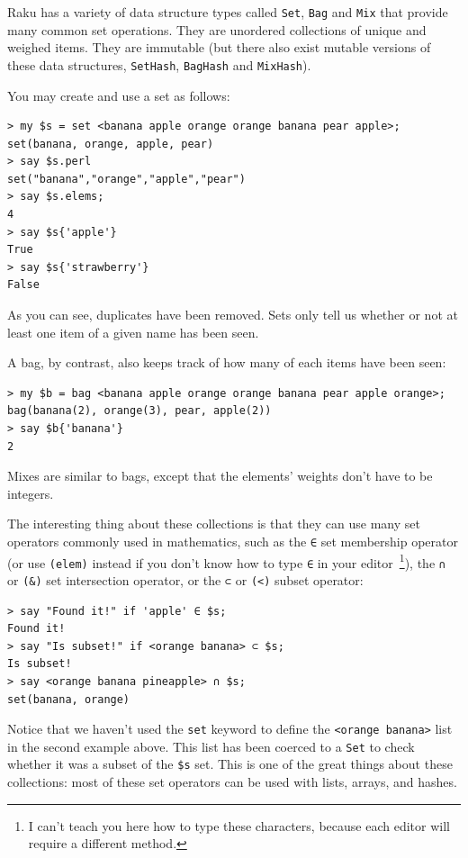 Raku has a variety of data structure types called {\tt Set}, 
{\tt Bag} and {\tt Mix} that provide many common set 
operations. They are unordered collections of unique and 
weighed items. They are immutable (but there also exist mutable 
versions of these data structures, {\tt SetHash}, {\tt BagHash} 
and {\tt MixHash}).

You may create and use a set as follows:

\begin{verbatim}
> my $s = set <banana apple orange orange banana pear apple>;
set(banana, orange, apple, pear)
> say $s.perl
set("banana","orange","apple","pear")
> say $s.elems;
4
> say $s{'apple'}
True
> say $s{'strawberry'}
False
\end{verbatim}
%
As you can see, duplicates have been removed. Sets only tell us 
whether or not at least one item of a given name has been seen.

A bag, by contrast, also keeps track of how many of each items 
have been seen:

\begin{verbatim}
> my $b = bag <banana apple orange orange banana pear apple orange>;
bag(banana(2), orange(3), pear, apple(2))
> say $b{'banana'}
2
\end{verbatim} 

Mixes are similar to bags, except that the elements' weights don't 
have to be integers.

The interesting thing about these collections is that they can use 
many set operators commonly used in mathematics, such as the 
\verb'∈' set membership operator (or use \verb'(elem)' instead 
if you don't know how to type \verb'∈' in your 
editor~\footnote{I can't teach you here how to type these characters, 
because each editor will require a different method.}), the \verb'∩' or 
\verb'(&)' set intersection operator, or the \verb'⊂' or 
\verb'(<)' subset operator:

\begin{verbatim}
> say "Found it!" if 'apple' ∈ $s;
Found it!
> say "Is subset!" if <orange banana> ⊂ $s;
Is subset!
> say <orange banana pineapple> ∩ $s;
set(banana, orange)
\end{verbatim}

Notice that we haven't used the {\tt set} keyword to define the 
\verb'<orange banana>' list in the second example above. This list 
has been coerced to a {\tt Set} to check whether it was a subset 
of the \verb'$s' set. This is one of the great things about these 
collections: most of these set operators can be used with lists, 
arrays, and hashes.

